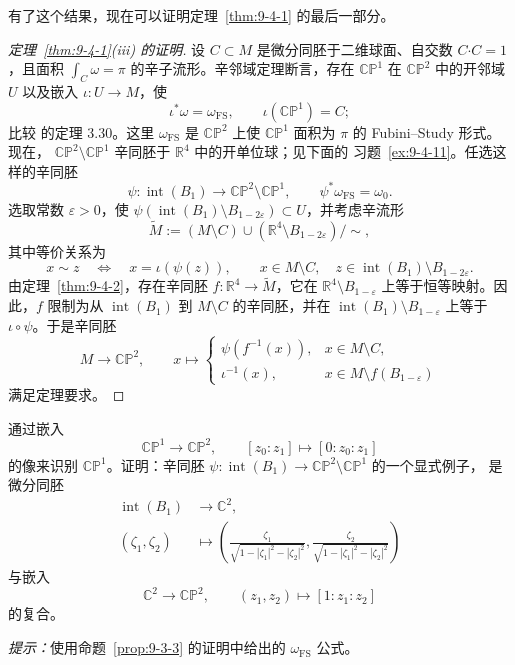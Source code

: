 有了这个结果，现在可以证明定理~\ref{thm:9-4-1} 的最后一部分。

\begin{proof}[定理~\ref{thm:9-4-1}(iii) 的证明]
设 $C\subset M$ 是微分同胚于二维球面、自交数
$C\mathbin{\boldsymbol\cdot}C=1$，且面积
$\int_C\omega=\pi$ 的辛子流形。辛邻域定理断言，存在
$\mathbb{CP}^1$ 在 $\mathbb{CP}^2$ 中的开邻域 $U$ 以及嵌入
$\iota:U\to M$，使
\[
  \iota^*\omega=\omega_{\mathrm{FS}},
  \qquad
  \iota(\mathbb{CP}^1)=C;
\]
比较  的定理 3.30。这里 $\omega_{\mathrm{FS}}$ 是
$\mathbb{CP}^2$ 上使 $\mathbb{CP}^1$ 面积为 $\pi$ 的 Fubini--Study 形式。现在，
$\mathbb{CP}^2\setminus\mathbb{CP}^1$ 辛同胚于 $\mathbb R^4$ 中的开单位球；见下面的
习题~\ref{ex:9-4-11}。任选这样的辛同胚
\[
  \psi:\operatorname{int}(B_1)
  \longrightarrow\mathbb{CP}^2\setminus\mathbb{CP}^1,
  \qquad
  \psi^*\omega_{\mathrm{FS}}=\omega_0.
\]
选取常数 $\varepsilon>0$，使
$\psi(\operatorname{int}(B_1)\setminus B_{1-2\varepsilon})\subset U$，并考虑辛流形
\[
  \widetilde M:=(M\setminus C)\cup(\mathbb R^4\setminus B_{1-2\varepsilon})\big/\sim,
\]
其中等价关系为
\[
  x\sim z
  \quad\Longleftrightarrow\quad
  x=\iota(\psi(z)),
  \qquad
  x\in M\setminus C,
  \quad
  z\in\operatorname{int}(B_1)\setminus B_{1-2\varepsilon}.
\]
由定理~\ref{thm:9-4-2}，存在辛同胚
$f:\mathbb R^4\to\widetilde M$，它在
$\mathbb R^4\setminus B_{1-\varepsilon}$ 上等于恒等映射。因此，$f$ 限制为从
$\operatorname{int}(B_1)$ 到 $M\setminus C$ 的辛同胚，并在
$\operatorname{int}(B_1)\setminus B_{1-\varepsilon}$ 上等于 $\iota\circ\psi$。于是辛同胚
\[
  M\longrightarrow\mathbb{CP}^2,
  \qquad
  x\longmapsto
  \begin{cases}
    \psi(f^{-1}(x)),&x\in M\setminus C,\\
    \iota^{-1}(x),&x\in M\setminus f(B_{1-\varepsilon})
  \end{cases}
\]
满足定理要求。
\end{proof}

\begin{exercise}\label{ex:9-4-11}
通过嵌入
\[
  \mathbb{CP}^1\longrightarrow\mathbb{CP}^2,
  \qquad
  [z_0:z_1]\longmapsto[0:z_0:z_1]
\]
的像来识别 $\mathbb{CP}^1$。证明：辛同胚
$\psi:\operatorname{int}(B_1)\to\mathbb{CP}^2\setminus\mathbb{CP}^1$ 的一个显式例子，
是微分同胚
\[
\begin{split}
  \operatorname{int}(B_1)&\longrightarrow\mathbb C^2,\\
  (\zeta_1,\zeta_2)&\longmapsto
  \left(
    \frac{\zeta_1}{\sqrt{1-|\zeta_1|^2-|\zeta_2|^2}},
    \frac{\zeta_2}{\sqrt{1-|\zeta_1|^2-|\zeta_2|^2}}
  \right)
\end{split}
\]
与嵌入
\[
  \mathbb C^2\longrightarrow\mathbb{CP}^2,
  \qquad
  (z_1,z_2)\longmapsto[1:z_1:z_2]
\]
的复合。

\emph{提示：}使用命题~\ref{prop:9-3-3} 的证明中给出的
$\omega_{\mathrm{FS}}$ 公式。
\end{exercise}

